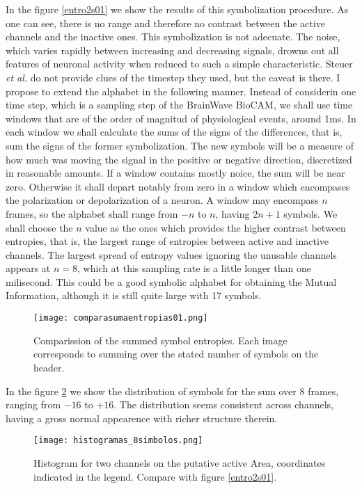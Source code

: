 \documentclass[10pt]{article}
\begin{document}
In the figure \ref{entro2s01} we show the results of this symbolization procedure.
As one can see, there is no range and therefore no contrast between the
active channels and the inactive ones. This symbolization is not adecuate. The
noise, which varies rapidly between increasing and decreasing signals, drowns
out all features of neuronal activity when reduced to such a simple characteristic.
Steuer \emph{et al.} do not provide clues of the timestep they used, but the caveat
is there. I propose to extend the alphabet in the following manner.
Instead of considerin one time step, which is a sampling step of the BrainWave
BioCAM, we shall use time windows that are of the order of magnitud of physiological
events, around 1ms. In each window we shall calculate the sums of the signs
of the differences, that is, sum the signs of the former symbolization. The new symbols
will be a measure of how much was moving the signal in the positive or negative
direction, discretized in reasonable amounts. If a window contains mostly noice,
the sum will be near zero. Otherwise it shall depart notably from zero
in a window which encompases the polarization or depolarization of a neuron. A window
may encompass $n$ frames, so the alphabet shall range from $-n$ to $n$, having
$2n+1$ symbols. We shall choose the $n$ value as the ones which provides the
higher contrast between entropies, that is, the largest range of entropies between
active and inactive channels. The largest spread of entropy values ignoring the
unusable channels appears at $n=8$, which at this sampling rate is a little longer
than one milisecond. This could be a good symbolic alphabet for obtaining the
Mutual Information, although it is still quite large with 17 symbols. 
\begin{figure}
  \begin{center}
    \texttt{[image: comparasumaentropias01.png]}
    \end{center}
  \caption{Comparission of the summed symbol entropies. Each image corresponds
    to summing over the stated number of symbols on the header.}
  \label{compsumentro}
\end{figure}

In the figure  \ref{h8sim} we
show the distribution of symbols for the sum over 8 frames, ranging from
$-16$ to $+16$. The distribution seems consistent across channels, having a
gross normal appearence with richer structure therein.

\begin{figure}
  \centering
  \texttt{[image: histogramas\_8simbolos.png]}
  \caption{Histogram for two channels on the putative active Area, coordinates indicated in the legend. Compare with figure \ref{entro2s01}.}
  \label{h8sim}
\end{figure}
\end{document}
